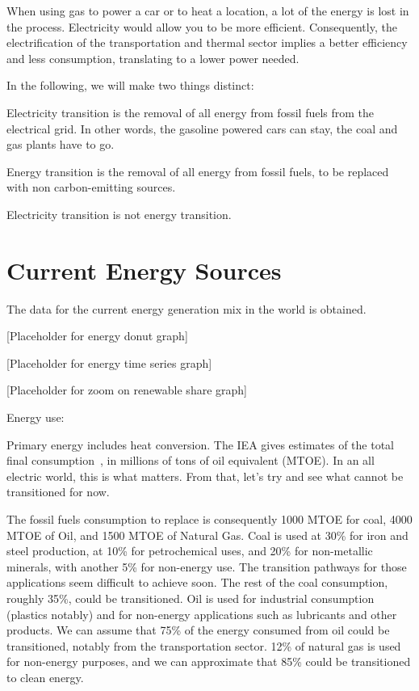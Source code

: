When using gas to power a car or to heat a location, a lot of the energy is lost in the process. Electricity would allow you to be more efficient. Consequently, the electrification of the transportation and thermal sector implies a better efficiency and less consumption, translating to a lower power needed.

In the following, we will make two things distinct:


\begin{kaobox}[frametitle=Electricity Transition]
Electricity transition is the removal of all energy from fossil fuels from the electrical grid. In other words, the gasoline powered cars can stay, the coal and gas plants have to go.
\end{kaobox}

\begin{kaobox}[frametitle=Energy Transition]
Energy transition is the removal of all energy from fossil fuels, to be replaced with non carbon-emitting sources.
\end{kaobox}

Electricity transition is not energy transition.


\section{Current Energy Sources}

The data for the current energy generation mix in the world is obtained.

[Placeholder for energy donut graph]

[Placeholder for energy time series graph]

[Placeholder for zoom on renewable share graph]




Energy use:

Primary energy includes heat conversion. The IEA gives estimates of the total final consumption~, in millions of tons of oil equivalent (MTOE). In an all electric world, this is what matters. From that, let's try and see what cannot be transitioned for now.

The fossil fuels consumption to replace is consequently 1000 MTOE for coal, 4000 MTOE of Oil, and 1500 MTOE of Natural Gas. Coal is used at 30\% for iron and steel production, at 10\% for petrochemical uses, and 20\% for non-metallic minerals, with another 5\% for non-energy use. The transition pathways for those applications seem difficult to achieve soon. The rest of the coal consumption, roughly 35\%, could be transitioned. Oil is used for industrial consumption (plastics notably) and for non-energy applications such as lubricants and other products. We can assume that 75\% of the energy consumed from oil could be transitioned, notably from the transportation sector. 12\% of natural gas is used for non-energy purposes, and we can approximate that 85\% could be transitioned to clean energy.

